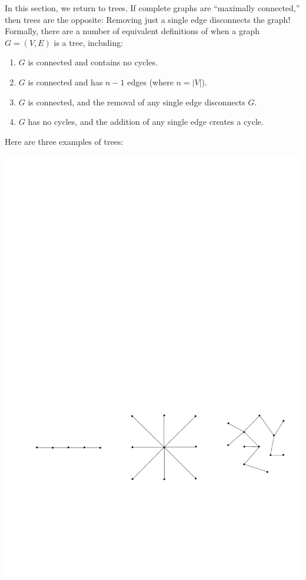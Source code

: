 \documentclass[11pt]{article}
\begin{document}
In this section, we return to trees. If complete graphs are ``maximally connected,'' then trees are the opposite: Removing just a single edge disconnects the graph! Formally, there are a number of equivalent definitions of when a graph $G=(V,E)$ is a tree, including:
\begin{enumerate}
    \item $G$ is connected and contains no cycles.
    \item $G$ is connected and has $n-1$ edges (where $n = |V|$).
    \item $G$ is connected, and the removal of any single edge disconnects $G$.
    \item $G$ has no cycles, and the addition of any single edge creates a cycle.
\end{enumerate}
Here are three examples of trees:
\begin{center}
\includegraphics[scale=0.6]{tree1.pdf}
\end{center}
\end{document}
